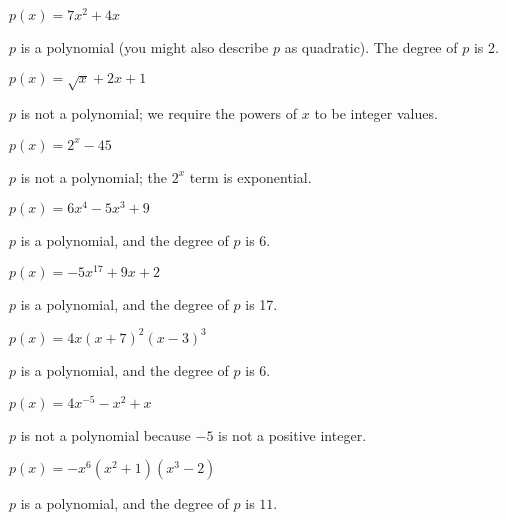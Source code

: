 \begin{exercises}
\begin{problem}
\begin{multicols}{3}
\begin{subproblem}
\begin{shortsolution}
		\end{shortsolution}
	\end{subproblem}
	\begin{subproblem}
		$p(x)=7x^2+4x$
		\begin{shortsolution}
			$p$ is a polynomial (you might also describe $p$ as quadratic). The degree of $p$ is 2.
		\end{shortsolution}
	\end{subproblem}
	\begin{subproblem}
		$p(x)=\sqrt{x}+2x+1$
		\begin{shortsolution}
			$p$ is not a polynomial; we require the powers of $x$ to be integer values.
		\end{shortsolution}
	\end{subproblem}
	\begin{subproblem}
		$p(x)=2^x-45$
		\begin{shortsolution}
			$p$ is not a polynomial; the $2^x$ term is exponential.
		\end{shortsolution}
	\end{subproblem}
	\begin{subproblem}
		$p(x)=6x^4-5x^3+9$
		\begin{shortsolution}
			$p$ is a polynomial, and the degree of $p$ is $6$.
		\end{shortsolution}
	\end{subproblem}
	\begin{subproblem}
		$p(x)=-5x^{17}+9x+2$
		\begin{shortsolution}
			$p$ is a polynomial, and the degree of $p$ is 17.
		\end{shortsolution}
	\end{subproblem}
	\begin{subproblem}
		$p(x)=4x(x+7)^2(x-3)^3$
		\begin{shortsolution}
			$p$ is a polynomial, and the degree of $p$ is $6$.
		\end{shortsolution}
	\end{subproblem}
	\begin{subproblem}
		$p(x)=4x^{-5}-x^2+x$
		\begin{shortsolution}
			$p$ is not a polynomial because $-5$ is not a positive integer.
		\end{shortsolution}
	\end{subproblem}
	\begin{subproblem}
		$p(x)=-x^6(x^2+1)(x^3-2)$
		\begin{shortsolution}
			$p$ is a polynomial, and the degree of $p$ is $11$.

\end{shortsolution}
\end{subproblem}
\end{multicols}
\end{problem}
\end{exercises}
